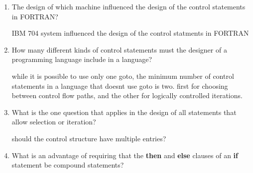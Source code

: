 \begin{enumerate}
  \item The design of which machine influenced the design
    of the control statements in FORTRAN?
    \begin{answer}
    IBM 704 system influenced the design of the control statments in FORTRAN
    \end{answer}
  \item How many different kinds of control statements
    must the designer of a programming language include
    in a language?
    \begin{answer}
      while it is possible to use only one goto, the minimum number of control statements in a language that doesnt use goto is two. first for choosing between control flow paths, and the other for logically controlled iterations.
      \end{answer}

  \item What is the one question that applies in the
    design of all statements that allow selection or
    iteration?
    \begin{answer}
      should the control structure have multiple entries?
      \end{answer}

  \item What is an advantage of requiring that
    the \textbf{then} and \textbf{else} clauses of
    an \textbf{if} statement be compound statements?

\end{enumerate}
